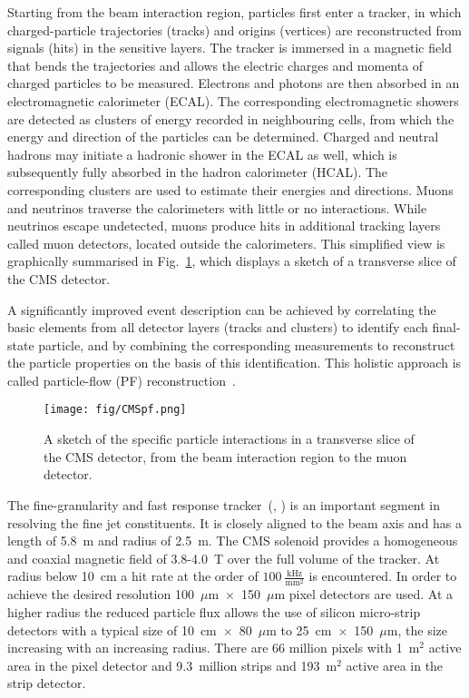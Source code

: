 Starting from the beam interaction region, particles first enter a tracker, in which charged-particle trajectories (tracks) and origins (vertices) are reconstructed from signals (hits) in the sensitive layers.  The tracker is immersed in a magnetic field that bends the trajectories and allows the electric charges and momenta of charged particles to be measured. Electrons and photons are then absorbed in an electromagnetic calorimeter (ECAL). The corresponding electromagnetic showers are detected as clusters of energy recorded in neighbouring cells, from which the energy and direction of the particles can be determined.  Charged and neutral hadrons may initiate a hadronic shower in the ECAL as well, which is subsequently fully absorbed in the hadron calorimeter (HCAL). The corresponding clusters are used to estimate their energies and directions.  Muons and neutrinos traverse the calorimeters with little or no interactions. While neutrinos escape undetected, muons produce hits in additional tracking layers called muon detectors, located outside the calorimeters. This simplified view is graphically summarised in Fig.~\ref{fig:CMSpf}, which displays a sketch of a transverse slice of the CMS detector.

A significantly improved event description can be achieved by correlating the basic elements from all detector layers (tracks and clusters) to identify each final-state particle, and by combining the corresponding measurements to reconstruct the particle properties on the basis of this identification. This holistic approach is called particle-flow (PF) reconstruction~\cite{Sirunyan:2017ulk}.

\begin{figure}[h]
  \centering
  \texttt{[image: fig/CMSpf.png]}
  \caption{A sketch of the specific particle interactions in a transverse slice of the CMS detector, from the beam interaction region to the muon detector.}
  \label{fig:CMSpf}
\end{figure}

The fine-granularity and fast response tracker~(\cite{Karimaki:368412}, \cite{tracker_addendum}) is an important segment in resolving the fine jet constituents. It is closely aligned to the beam axis and has a length of 5.8~m and radius of 2.5~m. The CMS solenoid provides a homogeneous and coaxial magnetic field of 3.8-4.0~T over the full volume of the tracker. At radius below 10~cm a hit rate at the order of $100~\frac{\text{kHz}}{\text{mm}^2}$ is encountered. In order to achieve the desired resolution 100~$\mu$m~$\times$~150~$\mu$m pixel detectors are used. At a higher radius the reduced particle flux allows the use of silicon micro-strip detectors with a typical size of 10~cm~$\times$~80~$\mu\text{m}$ to 25~cm~$\times$~150~$\mu$m, the size increasing with an increasing radius. There are 66 million pixels with 1~$\text{m}^{2}$ active area in the pixel detector and 9.3~million strips and 193~${\text{m}}^2$ active area in the strip detector.

